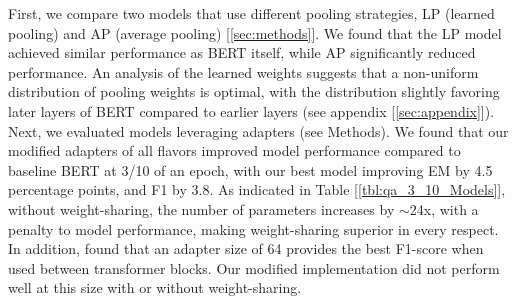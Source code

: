 First, we compare two models that use different pooling strategies, LP (learned pooling) and AP (average pooling) [\ref{sec:methods}]. We found that the LP model achieved similar performance as BERT itself, while AP significantly reduced performance. An analysis of the learned weights suggests that a non-uniform distribution of pooling weights is optimal, with the distribution slightly favoring later layers of BERT compared to earlier layers (see appendix [\ref{sec:appendix}]). \\

Next, we evaluated models leveraging adapters (see Methods). We found that our modified adapters of all flavors improved model performance compared to baseline BERT at 3/10 of an epoch, with our best model improving EM by 4.5 percentage points, and F1 by 3.8. As indicated in Table [\ref{tbl:qa_3_10_Models}], without weight-sharing, the number of parameters increases by $\sim$24x, with a penalty to model performance, making weight-sharing superior in every respect. In addition, \cite{DBLP:journals/corr/abs-1902-00751} found that an adapter size of 64 provides the best F1-score when used between transformer blocks. Our modified implementation did not perform well at this size with or without weight-sharing. \\

